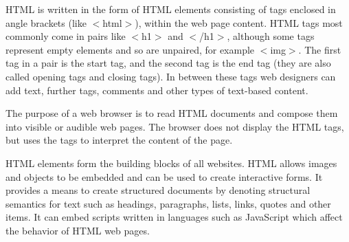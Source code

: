 HTML is written in the form of HTML elements consisting of tags enclosed in
 angle brackets (like $<$html$>$), within the web page content. HTML tags most
 commonly come in pairs like $<$h1$>$ and $<$/h1$>$, although some tags represent 
empty elements and so are unpaired, for example $<$img$>$. The first tag in a 
pair is the start tag, and the second tag is the end tag (they are also 
called opening tags and closing tags). In between these tags web designers 
can add text, further tags, comments and other types of text-based content.

The purpose of a web browser is to read HTML documents and compose them into 
visible or audible web pages. The browser does not display the HTML tags, but 
uses the tags to interpret the content of the page.

HTML elements form the building blocks of all websites. HTML allows images and 
objects to be embedded and can be used to create interactive forms. It provides 
a means to create structured documents by denoting structural semantics for text 
such as headings, paragraphs, lists, links, quotes and other items. It can embed 
scripts written in languages such as JavaScript which affect the behavior of 
HTML web pages.


